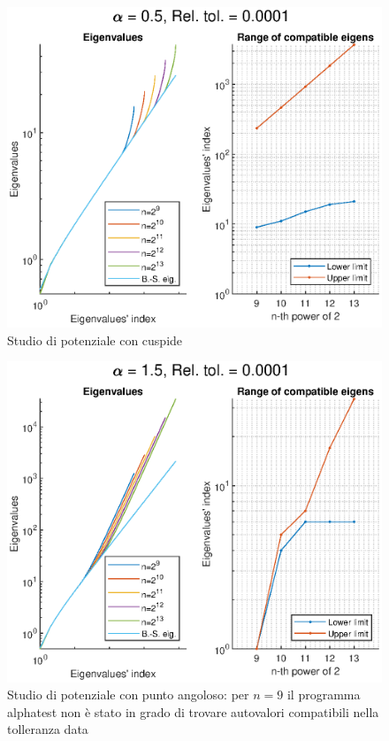 \documentclass[a4paper,11pt,twoside,twocolumn]{article}
\begin{document}
\begin{figure}
    \centering
    \includegraphics[width=1.0\columnwidth]{a05}
    \caption{Studio di potenziale con cuspide}
    \label{f05}
\end{figure}

\begin{figure}
    \centering
    \includegraphics[width=1.0\columnwidth]{a15}
    \caption{Studio di potenziale con punto angoloso: per \(n=9\) il programma alphatest non è stato in grado di trovare autovalori compatibili nella tolleranza data}
    \label{f15}
\end{figure}
\end{document}
